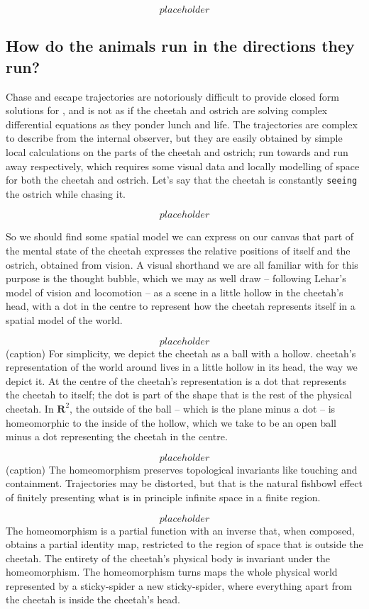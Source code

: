 \[placeholder\]

\subsection{How do the animals run in the directions they run?}

Chase and escape trajectories are notoriously difficult to provide closed form solutions for \citep{}, and is not as if the cheetah and ostrich are solving complex differential equations as they ponder lunch and life. The trajectories are complex to describe from the internal observer, but they are easily obtained by simple local calculations on the parts of the cheetah and ostrich; run towards and run away respectively, which requires some visual data and locally modelling of space for both the cheetah and ostrich. Let's say that the cheetah is constantly \texttt{seeing} the ostrich while chasing it.

\[placeholder\]

So we should find some spatial model we can express on our canvas that part of the mental state of the cheetah expresses the relative positions of itself and the ostrich, obtained from vision. A visual shorthand we are all familiar with for this purpose is the thought bubble, which we may as well draw -- following Lehar's model of vision and locomotion \citep{} -- as a scene in a little hollow in the cheetah's head, with a dot in the centre to represent how the cheetah represents itself in a spatial model of the world.

\[placeholder\]
(caption) For simplicity, we depict the cheetah as a ball with a hollow. cheetah's representation of the world around lives in a little hollow in its head, the way we depict it. At the centre of the cheetah's representation is a dot that represents the cheetah to itself; the dot is part of the shape that is the rest of the physical cheetah. In $\mathbf{R}^2$, the outside of the ball -- which is the plane minus a dot -- is homeomorphic to the inside of the hollow, which we take to be an open ball minus a dot representing the cheetah in the centre.

\[placeholder\]
(caption) The homeomorphism preserves topological invariants like touching and containment. Trajectories may be distorted, but that is the natural fishbowl effect of finitely presenting what is in principle infinite space in a finite region.

\[placeholder\]
The homeomorphism is a partial function with an inverse that, when composed, obtains a partial identity map, restricted to the region of space that is outside the cheetah. The entirety of the cheetah's physical body is invariant under the homeomorphism. The homeomorphism turns maps the whole physical world represented by a sticky-spider a new sticky-spider, where everything apart from the cheetah is inside the cheetah's head.

